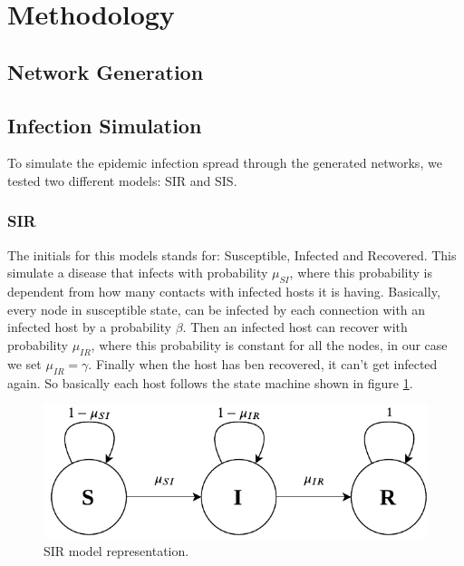 \section{Methodology}
\subsection{Network Generation}
\subsection{Infection Simulation}
To simulate the epidemic infection spread through the generated networks, we tested two different models: SIR and SIS.
\subsubsection{SIR}
The initials for this models stands for: Susceptible, Infected and Recovered. This simulate a disease that infects with probability $\mu_{SI}$, where this probability is dependent from how many contacts with infected hosts it is having. Basically, every node in susceptible state, can be infected by each connection with an infected host by a probability $\beta$. Then an infected host can recover with probability $\mu_{IR}$, where this probability is constant for all the nodes, in our case we set $\mu_{IR}=\gamma$. Finally when the host has ben recovered, it can't get infected again. So basically each host follows the state machine shown in figure \ref{fig:sir}.
\begin{figure}[htbp]
    \centering
    \includegraphics[width=\linewidth]{../img/SIR_model.pdf}
    \caption{SIR model representation.}
    \label{fig:sir}
\end{figure}

